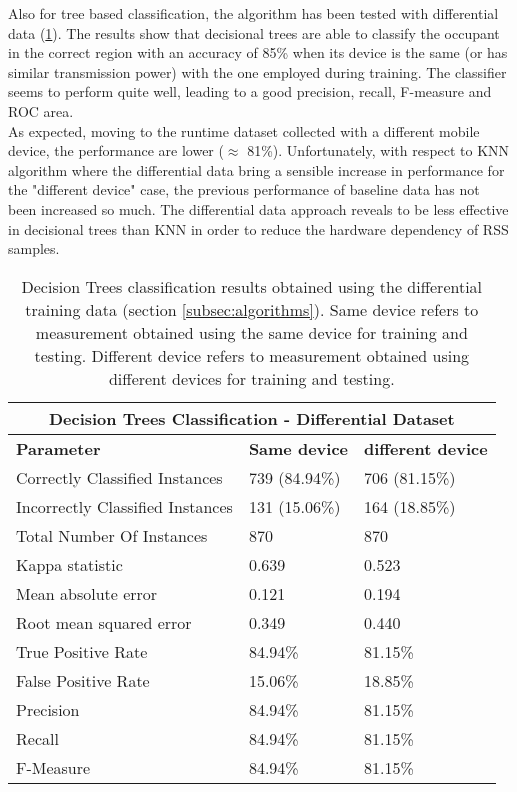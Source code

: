 Also for tree based classification, the algorithm has been tested with differential data (\ref{tab:tree-diff}).
The results show that decisional trees are able to classify the occupant in the correct region with an accuracy of 85\% when its device is the same (or has similar transmission power) with the one employed during training.
The classifier seems to perform quite well, leading to a good precision, recall, F-measure and ROC area.\\
As expected, moving to the runtime dataset collected with a different mobile device, the performance are lower ($\approx$ 81\%). Unfortunately, with respect to KNN algorithm where the differential data bring a sensible increase in performance for the "different device" case, the previous performance of baseline data has not been increased so much. The differential data approach reveals to be less effective in decisional trees than KNN in order to reduce the hardware dependency of RSS samples.

\begin{table}
\center
\caption[Decision Trees classification results obtained using the differential training data.]{Decision Trees classification results obtained using the differential training data (section \ref{subsec:algorithms}). Same device refers to measurement obtained using the same device for training and testing. Different device refers to measurement obtained using different devices for training and testing.}
\label{tab:tree-diff}
\begin{tabular}{ |l|l|l| }
  \hline
  \multicolumn{3}{|c|}{\textbf{Decision Trees Classification - Differential Dataset}} \\
  \hline
  \textbf{Parameter} & \textbf{Same device} & \textbf{different device}\\
  \hline
  Correctly Classified Instances & 739 (84.94\%) & 706 (81.15\%) \\
  Incorrectly Classified Instances & 131 (15.06\%) & 164 (18.85\%) \\
  Total Number Of Instances & 870 & 870 \\
  Kappa statistic & 0.639 & 0.523 \\
  Mean absolute error & 0.121 & 0.194 \\
  Root mean squared error & 0.349 & 0.440 \\
  True Positive Rate & 84.94\% & 81.15\% \\
  False Positive Rate & 15.06\% & 18.85\% \\
  Precision & 84.94\% & 81.15\% \\
  Recall & 84.94\% & 81.15\% \\
  F-Measure & 84.94\% & 81.15\% \\
  \hline
\end{tabular}
\end{table}


